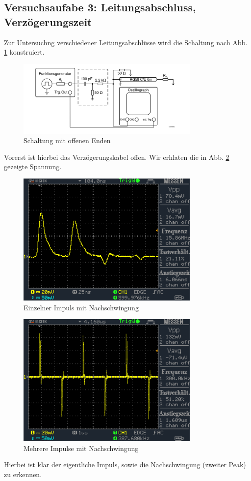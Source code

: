 \documentclass[a4paper,10pt]{article}
\numberwithin{equation}{section}
\begin{document}
\subsection{Versuchsaufabe 3: Leitungsabschluss, Verzögerungszeit}
Zur Untersuchng verschiedener Leitungsabschlüsse wird die Schaltung nach Abb. \ref{fig:3.1} konstruiert. 
\begin{figure}[h]
        \centering
        \includegraphics[width=0.8\textwidth]{Schaltung_Abschluss.png}
        \caption{Schaltung mit offenen Enden}
		\label{fig:3.1}
\end{figure}

Vorerst ist hierbei das Verzögerungskabel offen. Wir erhlaten die in Abb. \ref{fig:3.2} gezeigte Spannung.
\begin{figure}[h]
        \centering
        \includegraphics[width=0.8\textwidth]{data/DS0018.BMP.png}
        \caption{Einzelner Impuls mit Nachschwingung}
		\label{fig:3.2}
\end{figure}
\begin{figure}[h]
        \centering
        \includegraphics[width=0.8\textwidth]{data/DS0021.BMP.png}
        \caption{Mehrere Impulse mit Nachschwingung}
		\label{fig:3.3}
\end{figure}
Hierbei ist klar der eigentliche Impuls, sowie die Nachschwingung (zweiter Peak) zu erkennen.
\end{document}
